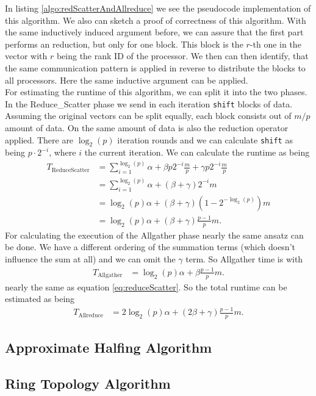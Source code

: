 In listing \ref{algo:redScatterAndAllreduce} we see the pseudocode implementation of this algorithm. We also can sketch a proof of correctness of this algorithm. With the same inductively induced argument before, we can assure that the first part performs an reduction, but only for one block. This block is the $r$-th one in the vector with $r$ being the rank ID of the processor. We then can then identify, that the same communication pattern is applied in reverse to distribute the blocks to all processors. Here the same inductive argument can be applied.\\
For estimating the runtime of this algorithm, we can split it into the two phases. In the Reduce\_Scatter phase we send in each iteration \texttt{shift} blocks of data. Assuming the original vectors can be split equally, each block consists out of $m/p$ amount of data. On the same amount of data is also the reduction operator applied. There are $\log_2(p)$ iteration rounds and we can calculate \texttt{shift} as being $p\cdot 2^{-i}$, where $i$ the current iteration. We can calculate the runtime as being
\begin{align}
	T_\mathrm{ReduceScatter}
	&= \sum_{i=1}^{\log_2(p)} \alpha + \beta p 2^{-i} \frac{m}{p} + \gamma p 2^{-i} \frac{m}{p} \nonumber\\
	&= \sum_{i=1}^{\log_2(p)} \alpha + (\beta + \gamma) 2^{-i} m\nonumber \\
	&=\log_2(p)\alpha + (\beta + \gamma) (1-2^{-\log_2(p)}) m\nonumber\\
	&=\log_2(p)\alpha + (\beta + \gamma) \frac{p-1}{p}m. \label{eq:reduceScatter}
\end{align}
For calculating the execution of the Allgather phase nearly the same ansatz can be done. We have a different ordering of the summation terms (which doesn't influence the sum at all) and we can omit the $\gamma$ term. So Allgather time is with 
\begin{align*}
	T_\mathrm{Allgather}
	&=\log_2(p)\alpha + \beta \frac{p-1}{p}m. 
\end{align*}
nearly the same as equation \ref{eq:reduceScatter}. So the total runtime can be estimated as being 
\begin{align*}
	T_\mathrm{Allreduce}
	&=2\log_2(p)\alpha + (2\beta + \gamma) \frac{p-1}{p}m. 
\end{align*}

\subsection{Approximate Halfing Algorithm}
\subsection{Ring Topology Algorithm}











